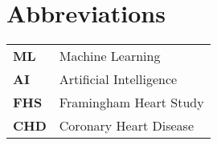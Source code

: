 \newpage
{}

\begin{abstract}


\end{abstract}
\newpage

\section*{Abbreviations}

\begin{tabular}{ll}
\textbf{ML}    & Machine Learning \\
\textbf{AI}    & Artificial Intelligence \\
\textbf{FHS}   & Framingham Heart Study \\
\textbf{CHD}   & Coronary Heart Disease \\
\end{tabular}


\listoffigures 
{}
\listoftables

\newpage

\tableofcontents

\newpage
{}